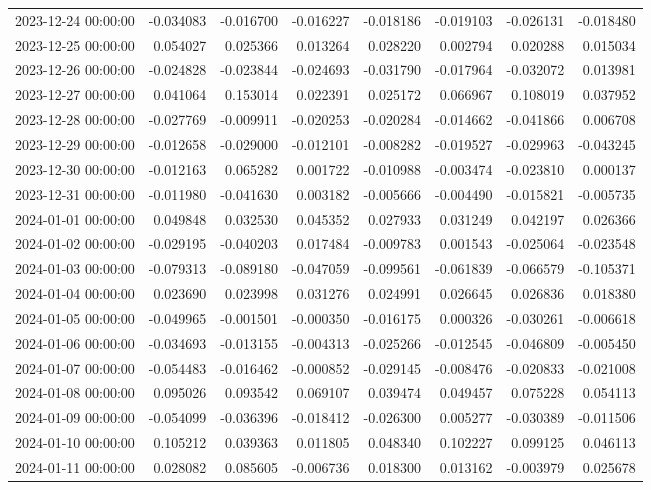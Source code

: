 \begin{tabular}{lrrrrrrr}
2023-12-24 00:00:00 & -0.034083 & -0.016700 & -0.016227 & -0.018186 & -0.019103 & -0.026131 & -0.018480 \\
2023-12-25 00:00:00 & 0.054027 & 0.025366 & 0.013264 & 0.028220 & 0.002794 & 0.020288 & 0.015034 \\
2023-12-26 00:00:00 & -0.024828 & -0.023844 & -0.024693 & -0.031790 & -0.017964 & -0.032072 & 0.013981 \\
2023-12-27 00:00:00 & 0.041064 & 0.153014 & 0.022391 & 0.025172 & 0.066967 & 0.108019 & 0.037952 \\
2023-12-28 00:00:00 & -0.027769 & -0.009911 & -0.020253 & -0.020284 & -0.014662 & -0.041866 & 0.006708 \\
2023-12-29 00:00:00 & -0.012658 & -0.029000 & -0.012101 & -0.008282 & -0.019527 & -0.029963 & -0.043245 \\
2023-12-30 00:00:00 & -0.012163 & 0.065282 & 0.001722 & -0.010988 & -0.003474 & -0.023810 & 0.000137 \\
2023-12-31 00:00:00 & -0.011980 & -0.041630 & 0.003182 & -0.005666 & -0.004490 & -0.015821 & -0.005735 \\
2024-01-01 00:00:00 & 0.049848 & 0.032530 & 0.045352 & 0.027933 & 0.031249 & 0.042197 & 0.026366 \\
2024-01-02 00:00:00 & -0.029195 & -0.040203 & 0.017484 & -0.009783 & 0.001543 & -0.025064 & -0.023548 \\
2024-01-03 00:00:00 & -0.079313 & -0.089180 & -0.047059 & -0.099561 & -0.061839 & -0.066579 & -0.105371 \\
2024-01-04 00:00:00 & 0.023690 & 0.023998 & 0.031276 & 0.024991 & 0.026645 & 0.026836 & 0.018380 \\
2024-01-05 00:00:00 & -0.049965 & -0.001501 & -0.000350 & -0.016175 & 0.000326 & -0.030261 & -0.006618 \\
2024-01-06 00:00:00 & -0.034693 & -0.013155 & -0.004313 & -0.025266 & -0.012545 & -0.046809 & -0.005450 \\
2024-01-07 00:00:00 & -0.054483 & -0.016462 & -0.000852 & -0.029145 & -0.008476 & -0.020833 & -0.021008 \\
2024-01-08 00:00:00 & 0.095026 & 0.093542 & 0.069107 & 0.039474 & 0.049457 & 0.075228 & 0.054113 \\
2024-01-09 00:00:00 & -0.054099 & -0.036396 & -0.018412 & -0.026300 & 0.005277 & -0.030389 & -0.011506 \\
2024-01-10 00:00:00 & 0.105212 & 0.039363 & 0.011805 & 0.048340 & 0.102227 & 0.099125 & 0.046113 \\
2024-01-11 00:00:00 & 0.028082 & 0.085605 & -0.006736 & 0.018300 & 0.013162 & -0.003979 & 0.025678 \\

\end{tabular}
